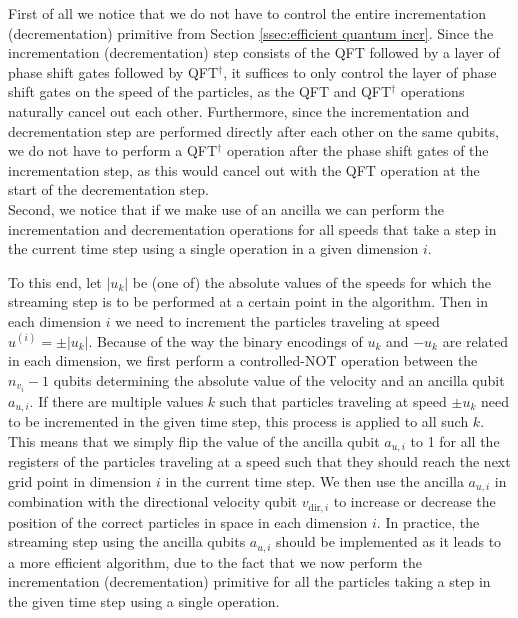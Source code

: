 First of all we notice that we do not have to control the entire incrementation (decrementation) primitive from Section \ref{ssec:efficient quantum incr}. Since the incrementation (decrementation) step consists of the QFT followed by a layer of phase shift gates followed by QFT$^\dagger$, it suffices to only control the layer of phase shift gates on the speed of the particles, as the QFT and QFT$^\dagger$ operations naturally cancel out each other. Furthermore, since the incrementation and decrementation step are performed directly after each other on the same qubits, we do not have to perform a QFT$^\dagger$ operation after the phase shift gates of the incrementation step, as this would cancel out with the QFT operation at the start of the decrementation step.  \\

Second, we notice that if we make use of an ancilla we can perform the incrementation and decrementation operations for all speeds that take a step in the current time step using a single operation in a given dimension $i$. 

To this end, let $|u_k|$ be (one of) the absolute values of the speeds for which the streaming step is to be performed at a certain point in the algorithm. Then in each dimension $i$ we need to increment the particles traveling at speed $u^{(i)} = \pm |u_k|$. Because of the way the binary encodings of $u_k$ and $-u_k$ are related in each dimension, we first perform a controlled-NOT operation between the $n_{v_i}-1$ qubits determining the absolute value of the velocity and an ancilla qubit $a_{u,i}$. If there are multiple values $k$ such that particles traveling at speed $\pm u_k$ need to be incremented in the given time step, this process is applied to all such $k$. This means that we simply flip the value of the ancilla qubit $a_{u,i}$ to 1 for all the registers of the particles traveling at a speed such that they should reach the next grid point in dimension $i$ in the current time step. We then use the ancilla $a_{u,i}$ in combination with the directional velocity qubit $v_{\text{dir},i}$ to increase or decrease the position of the correct particles in space in each dimension $i$. 
In practice, the streaming step using the ancilla qubits $a_{u,i}$ should be implemented as it leads to a more efficient algorithm, due to the fact that we now perform the incrementation (decrementation) primitive for all the particles taking a step in the given time step using a single operation. 


